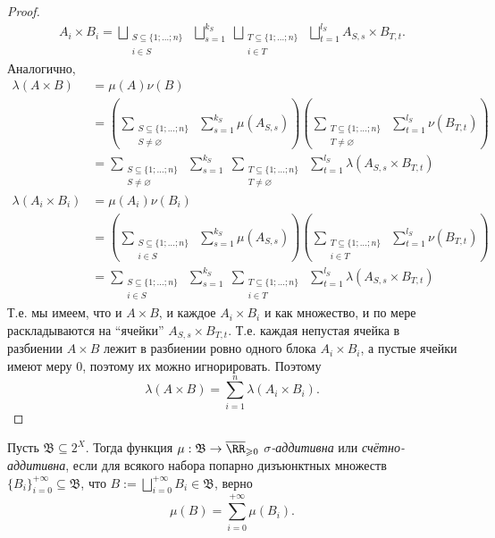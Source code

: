 \documentclass[12pt,a4paper]{article}
\begin{document}
\begin{proof}
\begin{gather*}
            A_i \times B_i = \bigsqcup_{\substack{S \subseteq \{1; \dots; n\}\\ i \in S}} \; \bigsqcup_{s=1}^{k_S} \; \bigsqcup_{\substack{T \subseteq \{1; \dots; n\}\\ i \in T}} \; \bigsqcup_{t=1}^{l_S} A_{S, s} \times B_{T, t}.
        \end{gather*}
        Аналогично,
        \begin{align*}
            \lambda(A \times B)
            &= \mu(A) \nu(B)\\
            &= \left(\sum_{\substack{S \subseteq \{1; \dots; n\}\\ S \neq \varnothing}} \; \sum_{s=1}^{k_S} \mu(A_{S, s})\right) \left(\sum_{\substack{T \subseteq \{1; \dots; n\}\\ T \neq \varnothing}} \; \sum_{t=1}^{l_S} \nu(B_{T, t})\right)\\
            &= \sum_{\substack{S \subseteq \{1; \dots; n\}\\ S \neq \varnothing}} \; \sum_{s=1}^{k_S} \; \sum_{\substack{T \subseteq \{1; \dots; n\}\\ T \neq \varnothing}} \; \sum_{t=1}^{l_S} \lambda(A_{S, s} \times B_{T, t})\\
            \lambda(A_i \times B_i)
            &= \mu(A_i) \nu(B_i)\\
            &= \left(\sum_{\substack{S \subseteq \{1; \dots; n\}\\ i \in S}} \; \sum_{s=1}^{k_S} \mu(A_{S, s})\right) \left(\sum_{\substack{T \subseteq \{1; \dots; n\}\\ i \in T}} \; \sum_{t=1}^{l_S} \nu(B_{T, t})\right)\\
            &= \sum_{\substack{S \subseteq \{1; \dots; n\}\\ i \in S}} \; \sum_{s=1}^{k_S} \; \sum_{\substack{T \subseteq \{1; \dots; n\}\\ i \in T}} \; \sum_{t=1}^{l_S} \lambda(A_{S, s} \times B_{T, t})
        \end{align*}
        Т.е. мы имеем, что и $A \times B$, и каждое $A_i \times B_i$ и как множество, и по мере раскладываются на ``ячейки'' $A_{S, s} \times B_{T, t}$. Т.е. каждая непустая ячейка в разбиении $A \times B$ лежит в разбиении ровно одного блока $A_i \times B_i$, а пустые ячейки имеют меру $0$, поэтому их можно игнорировать. Поэтому
        \[\lambda(A \times B) = \sum_{i=1}^n \lambda(A_i \times B_i).\]
    \end{proof}

    \begin{definition}
        Пусть $\mathfrak{B} \subseteq 2^X$. Тогда функция $\mu: \mathfrak{B} \to \overline{\RR}_{\geqslant 0}$ \emph{$\sigma$-аддитивна} или \emph{счётно-аддитивна}, если для всякого набора попарно дизъюнктных множеств $\{B_i\}_{i=0}^{+\infty} \subseteq \mathfrak{B}$, что $B := \bigsqcup_{i=0}^{+\infty} B_i \in \mathfrak{B}$, верно
        \[\mu(B) = \sum_{i=0}^{+\infty} \mu(B_i).\]
    \end{definition}
\end{document}

